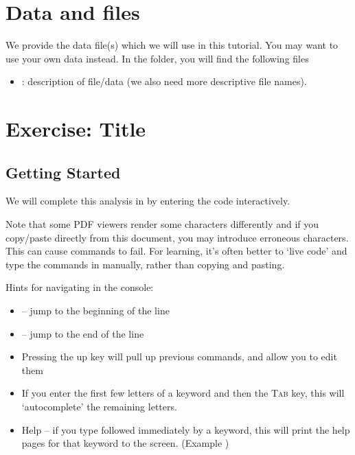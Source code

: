 \section{Data and files}

We provide the data file(s) which we will use in this tutorial.
You may want to use your own data instead.
In the  folder, you will find the following files
\begin{itemize}
\item {}: description of file/data (we also need more descriptive file names).
\end{itemize}



\section{Exercise: Title}

\bigskip
\subsection{Getting Started}

We will complete this analysis in \RevBayes by entering the \Rev code interactively. 

Note that some PDF viewers render some characters differently and if you copy/paste directly from this document, you may introduce erroneous characters. 
This can cause commands to fail. 
For learning, it's often better to `live code' and type the commands in manually, rather than copying and pasting. 

Hints for navigating in the \RevBayes console:
\begin{itemize}[noitemsep,topsep=0pt]
    \item {} -- jump to the beginning of the line
    \item {} -- jump to the end of the line
    \item Pressing the up key will pull up previous commands, and allow you to edit them
    \item If you enter the first few letters of a \RevBayes keyword and then the \textsc{Tab} key, this will `autocomplete' the remaining letters.
    \item Help -- if you type  followed immediately by a \RevBayes keyword, this will print the help pages for that keyword to the screen. (Example )
\end{itemize}

